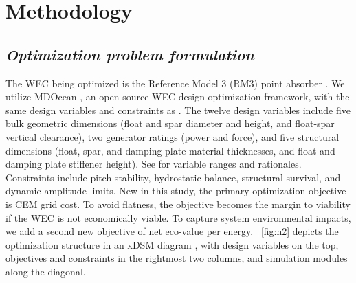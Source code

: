 \documentclass[10pt,twoside]{article}
\begin{document}
\section{Methodology}
\subsection{\textit{Optimization problem formulation}}
The WEC being optimized is the Reference Model 3 (RM3) point absorber \cite{RM3}.
We utilize MDOcean \cite{mccabe_mdocean_2024}, an open-source WEC design optimization framework, with the same design variables and constraints as \cite{mccabe_leveraging_2025}.
The twelve design variables include five bulk geometric dimensions (float and spar diameter and height, and float-spar vertical clearance), two generator ratings (power and force), and five structural dimensions (float, spar, and damping plate material thicknesses, and float and damping plate stiffener height).
See \cite{mccabe_leveraging_2025} for variable ranges and rationales.
Constraints include pitch stability, hydrostatic balance, structural survival, and dynamic amplitude limits.
New in this study, the primary optimization objective is CEM grid cost.
To avoid flatness, the objective becomes the margin to viability if the WEC is not economically viable.
To capture system environmental impacts, we add a second new objective of net eco-value per energy.
\figureautorefname~\ref{fig:n2} depicts the optimization structure in an xDSM diagram \cite{lambe_extensions_2012}, with design variables on the top, objectives and constraints in the rightmost two columns, and simulation modules along the diagonal.
\end{document}
